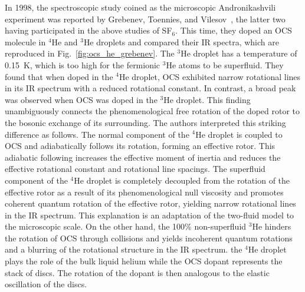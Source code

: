 \documentclass[12pt]{iopart}
\begin{document}
In 1998, the spectroscopic study coined as the microscopic Andronikashvili experiment was reported by Grebenev, Toennies, and Vilesov~\cite{grebenev_science}, the latter two having participated in the above studies of SF$_6$. 
This time, they doped an OCS molecule in $^4$He and $^3$He droplets and compared their IR spectra, which are reproduced in Fig.~\ref{fig:ocs_he_grebenev}. 
The $^3$He droplet has a temperature of 0.15~K, which is too high for the fermionic $^3$He atoms to be superfluid. 
They found that when doped in the $^4$He droplet, OCS exhibited narrow rotational lines in its IR spectrum with a reduced rotational constant. 
In contrast, a broad peak was observed when OCS was doped in the $^3$He droplet. 
This finding unambiguously connects the phenomenological free rotation of the doped rotor to the bosonic exchange of its surrounding. 
The authors interpreted this striking difference as follows. The normal component of the $^4$He droplet is coupled to OCS and adiabatically follows its rotation, forming an effective rotor. This adiabatic following increases the effective moment of inertia and reduces the effective rotational constant and rotational line spacings. The superfluid component of the $^4$He droplet is completely decoupled from the rotation of the effective rotor as a result of its phenomenological null viscosity and promotes coherent  quantum rotation of the effective rotor, yielding  narrow rotational lines in the IR spectrum. 
This explanation is an adaptation of the two-fluid model to the microscopic scale. 
On the other hand, the 100\% non-superfluid $^3$He hinders the rotation of OCS through collisions and yields incoherent quantum rotations and a blurring of the rotational structure in the IR spectrum.
the $^4$He droplet plays the role of the bulk liquid helium while the OCS dopant represents the stack of discs.
The rotation of the dopant is then analogous to the elastic oscillation of the discs.
\end{document}

